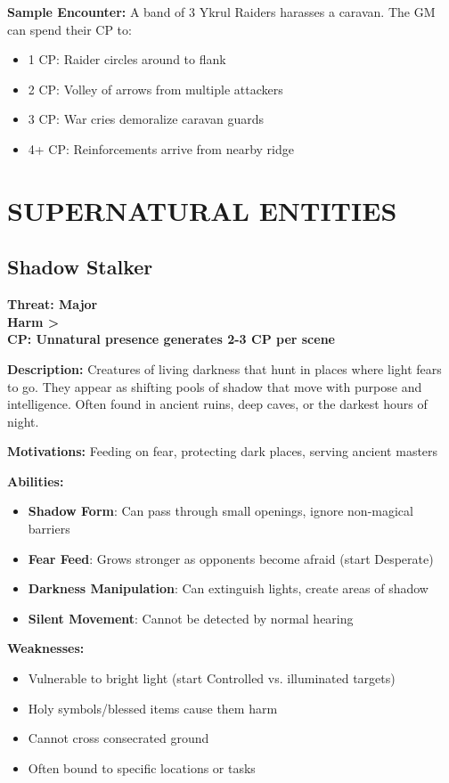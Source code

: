 \documentclass[12pt]{article}
\newcommand{\cp}[1]{\textbf{CP: #1}}
\newcommand{\harm}[1]{\textbf{Harm #1}}
\newcommand{\threat}[1]{\textbf{Threat: #1}}
\begin{document}
\textbf{Sample Encounter:}
A band of 3 Ykrul Raiders harasses a caravan. The GM can spend their CP to:
\begin{itemize}
\item 1 CP: Raider circles around to flank
\item 2 CP: Volley of arrows from multiple attackers
\item 3 CP: War cries demoralize caravan guards
\item 4+ CP: Reinforcements arrive from nearby ridge
\end{itemize}

\section{SUPERNATURAL ENTITIES}

\subsection*{Shadow Stalker}

\threat{Major} \\
\harm{>} \\
\cp{Unnatural presence generates 2-3 CP per scene}

\vspace{0.5em}
\textbf{Description:} Creatures of living darkness that hunt in places where light fears to go. They appear as shifting pools of shadow that move with purpose and intelligence. Often found in ancient ruins, deep caves, or the darkest hours of night.

\textbf{Motivations:} Feeding on fear, protecting dark places, serving ancient masters

\textbf{Abilities:}
\begin{itemize}
\item \textbf{Shadow Form}: Can pass through small openings, ignore non-magical barriers
\item \textbf{Fear Feed}: Grows stronger as opponents become afraid (start Desperate)
\item \textbf{Darkness Manipulation}: Can extinguish lights, create areas of shadow
\item \textbf{Silent Movement}: Cannot be detected by normal hearing
\end{itemize}

\textbf{Weaknesses:}
\begin{itemize}
\item Vulnerable to bright light (start Controlled vs. illuminated targets)
\item Holy symbols/blessed items cause them harm
\item Cannot cross consecrated ground
\item Often bound to specific locations or tasks
\end{itemize}
\end{document}
